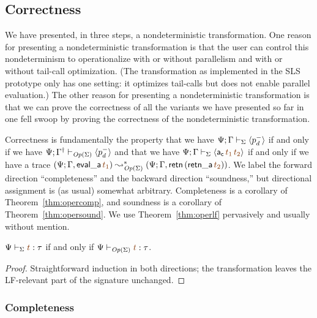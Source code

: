 \subsection{Correctness}
\label{sec:operationalization-correct}

We have presented, in three steps, a nondeterministic transformation.
One reason for presenting a nondeterministic transformation is that
the user can control this nondeterminism to operationalize with or
without parallelism and with or without tail-call optimization. (The
transformation as implemented in the SLS prototype only has one
setting: it optimizes tail-calls but does not enable parallel
evaluation.) The other reason for presenting a nondeterministic
transformation is that we can prove the correctness of all the
variants we have presented so far in one fell swoop by proving the
correctness of the nondeterministic transformation.

Correctness is fundamentally the property that
we have ${\Psi}; {\Gamma} \vdash_{\Sigma} {\langle {p^-_d} \rangle}$ if and only if 
we have
${\Psi}; {{{\Gamma}^\dag}} \vdash_{{\it Op}({\Sigma})} {\langle {p^-_d} \rangle}$
and that we have
$\slss{\Sigma}{\Psi}{\Gamma}{\susp{{\sf a_c}\,\lf{t_1}\,\lf{t_2}}}$ 
if and only if we have a trace
$(\Psi; \mkconj{\Gamma}{{\sf eval\_a}\,\lf{t_1}}) \leadsto^*_{\transop{\Sigma}} (\Psi; \mkconj{\Gamma}{{\sf retn}\,({\sf retn\_a}\,\lf{t_2})})$. We label the
forward direction ``completeness'' and the backward direction ``soundness,''
but directional assignment is (as usual) somewhat arbitrary. 
Completeness is a corollary
of Theorem~\ref{thm:opercomp}, and soundness is a corollary of 
Theorem~\ref{thm:opersound}. We use Theorem~\ref{thm:operlf} pervasively
and usually without mention. 

\bigskip
\begin{theorem}\label{thm:operlf}
  $\Psi \vdash_\Sigma \lf{t} : \tau$ if and only if $\Psi
  \vdash_{\transop{\Sigma}} \lf{t} : \tau$.
\end{theorem}

\begin{proof}
Straightforward induction in both directions; the transformation 
leaves the LF-relevant part of the signature unchanged.
\end{proof}

\subsubsection{Completeness}


